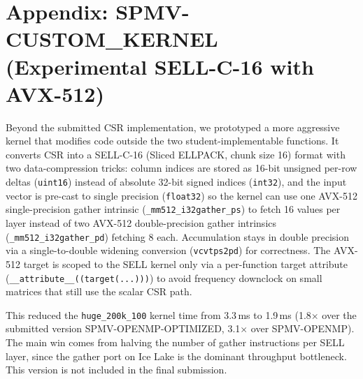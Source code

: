 \documentclass{article}
\begin{document}
\section*{Appendix: SPMV-CUSTOM\_KERNEL (Experimental SELL-C-16 with AVX-512)}
\label{sec:custom-kernel}

Beyond the submitted CSR implementation, we prototyped a more aggressive kernel that modifies code outside the two student-implementable functions. It converts CSR into a SELL-C-16 (Sliced ELLPACK, chunk size 16) format with two data-compression tricks: column indices are stored as 16-bit unsigned per-row deltas (\texttt{uint16}) instead of absolute 32-bit signed indices (\texttt{int32}), and the input vector is pre-cast to single precision (\texttt{float32}) so the kernel can use one AVX-512 single-precision gather intrinsic (\texttt{\_mm512\_i32gather\_ps}) to fetch 16 values per layer instead of two AVX-512 double-precision gather intrinsics (\texttt{\_mm512\_i32gather\_pd}) fetching 8 each. Accumulation stays in double precision via a single-to-double widening conversion (\texttt{vcvtps2pd}) for correctness. The AVX-512 target is scoped to the SELL kernel only via a per-function target attribute (\texttt{\_\_attribute\_\_((target(...)))}) to avoid frequency downclock on small matrices that still use the scalar CSR path.

This reduced the \texttt{huge\_200k\_100} kernel time from 3.3\,ms to 1.9\,ms (1.8$\times$ over the submitted version SPMV-OPENMP-OPTIMIZED, 3.1$\times$ over SPMV-OPENMP). The main win comes from halving the number of gather instructions per SELL layer, since the gather port on Ice Lake is the dominant throughput bottleneck. This version is not included in the final submission.
\end{document}
